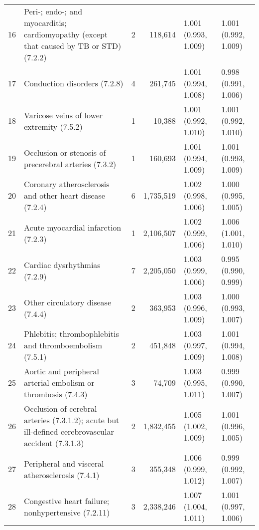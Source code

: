 \begin{tabular}{lp{6.5cm}rrp{2.2cm}p{2.2cm}}
    16 & Peri-; endo-; and myocarditis; cardiomyopathy (except that caused by TB or STD) (7.2.2) &    2 & 118,614 & 1.001 (0.993, 1.009) & 1.001 (0.992, 1.009) \\ 
    17 & Conduction disorders (7.2.8) &    4 & 261,745 & 1.001 (0.994, 1.008) & 0.998 (0.991, 1.006) \\ 
    18 & Varicose veins of lower extremity (7.5.2) &    1 & 10,388 & 1.001 (0.992, 1.010) & 1.001 (0.992, 1.010) \\ 
    19 & Occlusion or stenosis of precerebral arteries (7.3.2) &    1 & 160,693 & 1.001 (0.994, 1.009) & 1.001 (0.993, 1.009) \\ 
    20 & Coronary atherosclerosis and other heart disease (7.2.4) &    6 & 1,735,519 & 1.002 (0.998, 1.006) & 1.000 (0.995, 1.005) \\ 
    21 & Acute myocardial infarction (7.2.3) &    1 & 2,106,507 & 1.002 (0.999, 1.006) & 1.006 (1.001, 1.010) \\ 
    22 & Cardiac dysrhythmias (7.2.9) &    7 & 2,205,050 & 1.003 (0.999, 1.006) & 0.995 (0.990, 0.999) \\ 
    23 & Other circulatory disease (7.4.4) &    2 & 363,953 & 1.003 (0.996, 1.009) & 1.000 (0.993, 1.007) \\ 
    24 & Phlebitis; thrombophlebitis and thromboembolism (7.5.1) &    2 & 451,848 & 1.003 (0.997, 1.009) & 1.001 (0.994, 1.008) \\ 
    25 & Aortic and peripheral arterial embolism or thrombosis (7.4.3) &    3 & 74,709 & 1.003 (0.995, 1.011) & 0.999 (0.990, 1.007) \\ 
    26 & Occlusion of cerebral arteries (7.3.1.2); acute but ill-defined cerebrovascular accident (7.3.1.3) &    2 & 1,832,455 & 1.005 (1.002, 1.009) & 1.001 (0.996, 1.005) \\ 
    27 & Peripheral and visceral atherosclerosis (7.4.1) &    3 & 355,348 & 1.006 (0.999, 1.012) & 0.999 (0.992, 1.007) \\ 
    28 & Congestive heart failure; nonhypertensive (7.2.11) &    3 & 2,338,246 & 1.007 (1.004, 1.011) & 1.001 (0.997, 1.006) \\ 
   \hline
\end{tabular}

